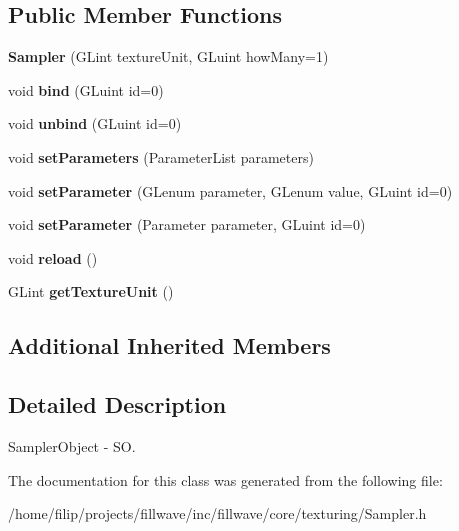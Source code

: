 \subsection*{Public Member Functions}
\begin{DoxyCompactItemize}
\item 
\mbox{\label{classflw_1_1flc_1_1Sampler_a20a25067b0f6dfbd2d99c2cb2d6db968}} 
{\bfseries Sampler} (G\+Lint texture\+Unit, G\+Luint how\+Many=1)
\item 
\mbox{\label{classflw_1_1flc_1_1Sampler_ada27f5e46e8e140ab15ed5a543a98bb6}} 
void {\bfseries bind} (G\+Luint id=0)
\item 
\mbox{\label{classflw_1_1flc_1_1Sampler_a4a44bb0d09c8e589cc45d593fda7418d}} 
void {\bfseries unbind} (G\+Luint id=0)
\item 
\mbox{\label{classflw_1_1flc_1_1Sampler_aa44590d3fa5425a730d5fd9740c2122a}} 
void {\bfseries set\+Parameters} (Parameter\+List parameters)
\item 
\mbox{\label{classflw_1_1flc_1_1Sampler_a14586c2d0807a06f4ff0da1b099b39df}} 
void {\bfseries set\+Parameter} (G\+Lenum parameter, G\+Lenum value, G\+Luint id=0)
\item 
\mbox{\label{classflw_1_1flc_1_1Sampler_ad0617f6aaa4688fb325b0620fb29a960}} 
void {\bfseries set\+Parameter} (Parameter parameter, G\+Luint id=0)
\item 
\mbox{\label{classflw_1_1flc_1_1Sampler_aa08785699a68a5cd1a25585be962e0f0}} 
void {\bfseries reload} ()
\item 
\mbox{\label{classflw_1_1flc_1_1Sampler_ae51636bb9368bbfce44b606312bd27d6}} 
G\+Lint {\bfseries get\+Texture\+Unit} ()
\end{DoxyCompactItemize}
\subsection*{Additional Inherited Members}


\subsection{Detailed Description}
Sampler\+Object -\/ SO. 

The documentation for this class was generated from the following file\+:\begin{DoxyCompactItemize}
\item 
/home/filip/projects/fillwave/inc/fillwave/core/texturing/Sampler.\+h\end{DoxyCompactItemize}
